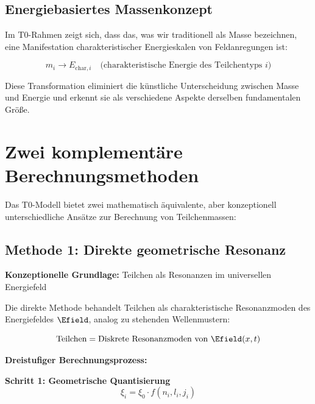 \subsection{Energiebasiertes Massenkonzept}
\label{subsec:energy_based_mass}

Im T0-Rahmen zeigt sich, dass das, was wir traditionell als Masse bezeichnen, eine Manifestation charakteristischer Energieskalen von Feldanregungen ist:

\begin{equation}
	\boxed{m_i \rightarrow E_{\text{char},i} \quad \text{(charakteristische Energie des Teilchentyps } i\text{)}}
	\label{eq:mass_to_energy}
\end{equation}

Diese Transformation eliminiert die künstliche Unterscheidung zwischen Masse und Energie und erkennt sie als verschiedene Aspekte derselben fundamentalen Größe.

\section{Zwei komplementäre Berechnungsmethoden}
\label{sec:two_calculation_methods}

Das T0-Modell bietet zwei mathematisch äquivalente, aber konzeptionell unterschiedliche Ansätze zur Berechnung von Teilchenmassen:

\subsection{Methode 1: Direkte geometrische Resonanz}
\label{subsec:direct_geometric_method}

\textbf{Konzeptionelle Grundlage:} Teilchen als Resonanzen im universellen Energiefeld

Die direkte Methode behandelt Teilchen als charakteristische Resonanzmoden des Energiefeldes $\Efield$, analog zu stehenden Wellenmustern:

\begin{equation}
	\text{Teilchen} = \text{Diskrete Resonanzmoden von } \Efield(x,t)
\end{equation}

\textbf{Dreistufiger Berechnungsprozess:}

\textbf{Schritt 1: Geometrische Quantisierung}
\begin{equation}
	\xi_i = \xi_0 \cdot f(n_i, l_i, j_i)
	\label{eq:geometric_quantization}
\end{equation}

